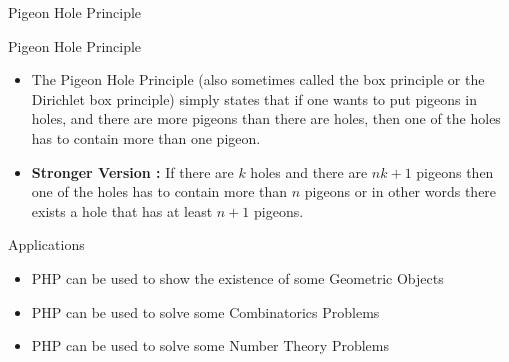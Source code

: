 \begin{frame}{Pigeon Hole Principle}
    \begin{block}{Pigeon Hole Principle}
        \begin{itemize}[<+->]
            \item The Pigeon Hole Principle (also sometimes called the box principle or the Dirichlet box principle) simply states that if one wants to put pigeons in holes, and there are more pigeons than there are holes, then one of the holes has to contain more than one pigeon.
            \item {\bf{Stronger Version :}} If there are $k$ holes and there are $nk + 1$ pigeons then one of the holes has to contain more than $n$ pigeons or in other words there exists a hole that has at least $n+1$ pigeons.  
        \end{itemize}
    \end{block}

    \pause
    
    \begin{block}{Applications}
        \begin{itemize}[<+->]
            \item PHP can be used to show the existence of some Geometric Objects
            \item PHP can be used to solve some Combinatorics Problems
            \item PHP can be used to solve some Number Theory Problems
        \end{itemize}
    \end{block}
\end{frame}